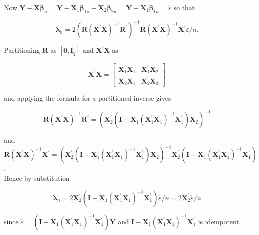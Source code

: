 \documentclass[10pt]{article}
\begin{document}
Now $\mathbf{Y}-\mathbf{X} \ddot{\boldsymbol{\beta}}_{n}=\mathbf{Y}-\mathbf{X}_{1} \ddot{\boldsymbol{\beta}}_{1 n}-\mathbf{X}_{2} \ddot{\boldsymbol{\beta}}_{2 n}=\mathbf{Y}-\mathbf{X}_{1} \ddot{\boldsymbol{\beta}}_{1 n}=\ddot{\varepsilon}$ so that

$$
\ddot{\boldsymbol{\lambda}}_{n}=2\left(\mathbf{R}\left(\mathbf{X}^{\prime} \mathbf{X}\right)^{-1} \mathbf{R}^{\prime}\right)^{-1} \mathbf{R}\left(\mathbf{X}^{\prime} \mathbf{X}\right)^{-1} \mathbf{X}^{\prime} \varepsilon / n .
$$

Partitioning $\mathbf{R}$ as $\left[\mathbf{0}, \mathbf{I}_{q}\right]$ and $\mathbf{X}^{\prime} \mathbf{X}$ as

$$
\mathbf{X}^{\prime} \mathbf{X}=\left[\begin{array}{ll}
\mathbf{X}_{1}^{\prime} \mathbf{X}_{1} & \mathbf{X}_{1}^{\prime} \mathbf{X}_{2} \\
\mathbf{X}_{2}^{\prime} \mathbf{X}_{1} & \mathbf{X}_{2}^{\prime} \mathbf{X}_{2}
\end{array}\right]
$$

and applying the formula for a partitioned inverse gives

$$
\mathbf{R}\left(\mathbf{X}^{\prime} \mathbf{X}\right)^{-1} \mathbf{R}^{\prime}=\left(\mathbf{X}_{2}^{\prime}\left(\mathbf{I}-\mathbf{X}_{1}\left(\mathbf{X}_{1}^{\prime} \mathbf{X}_{1}\right)^{-1} \mathbf{X}_{1}^{\prime}\right) \mathbf{X}_{2}\right)^{-1}
$$

and\\
$\mathbf{R}\left(\mathbf{X}^{\prime} \mathbf{X}\right)^{-1} \mathbf{X}^{\prime}=\left(\mathbf{X}_{2}^{\prime}\left(\mathbf{I}-\mathbf{X}_{1}\left(\mathbf{X}_{1}^{\prime} \mathbf{X}_{1}\right)^{-1} \mathbf{X}_{1}^{\prime}\right) \mathbf{X}_{2}\right)^{-1} \mathbf{X}_{2}^{\prime}\left(\mathbf{I}-\mathbf{X}_{1}\left(\mathbf{X}_{1}^{\prime} \mathbf{X}_{1}\right)^{-1} \mathbf{X}_{1}^{\prime}\right)$.\\
Hence by substitution

$$
\ddot{\boldsymbol{\lambda}}_{n}=2 \mathbf{X}_{2}^{\prime}\left(\mathbf{I}-\mathbf{X}_{1}\left(\mathbf{X}_{1}^{\prime} \mathbf{X}_{1}\right)^{-1} \mathbf{X}_{1}^{\prime}\right) \ddot{\varepsilon} / n=2 \mathbf{X}_{2}^{\prime} \ddot{\varepsilon} / n
$$

since $\ddot{\varepsilon}=\left(\mathbf{I}-\mathbf{X}_{1}\left(\mathbf{X}_{1}^{\prime} \mathbf{X}_{1}\right)^{-1} \mathbf{X}_{1}^{\prime}\right) \mathbf{Y}$ and $\mathbf{I}-\mathbf{X}_{1}\left(\mathbf{X}_{1}^{\prime} \mathbf{X}_{1}\right)^{-1} \mathbf{X}_{1}^{\prime}$ is idempotent.
\end{document}
